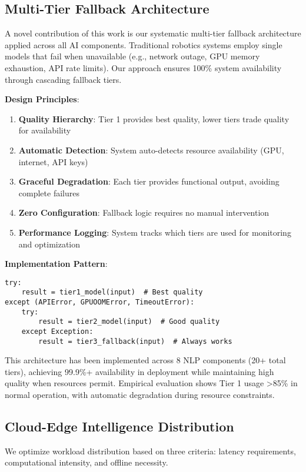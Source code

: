 \documentclass[conference]{IEEEtran}
\begin{document}
\subsection{Multi-Tier Fallback Architecture}

A novel contribution of this work is our systematic multi-tier fallback architecture applied across all AI components. Traditional robotics systems employ single models that fail when unavailable (e.g., network outage, GPU memory exhaustion, API rate limits). Our approach ensures 100\% system availability through cascading fallback tiers.

\textbf{Design Principles}:
\begin{enumerate}
    \item \textbf{Quality Hierarchy}: Tier 1 provides best quality, lower tiers trade quality for availability
    \item \textbf{Automatic Detection}: System auto-detects resource availability (GPU, internet, API keys)
    \item \textbf{Graceful Degradation}: Each tier provides functional output, avoiding complete failures
    \item \textbf{Zero Configuration}: Fallback logic requires no manual intervention
    \item \textbf{Performance Logging}: System tracks which tiers are used for monitoring and optimization
\end{enumerate}

\textbf{Implementation Pattern}:
\begin{verbatim}
try:
    result = tier1_model(input)  # Best quality
except (APIError, GPUOOMError, TimeoutError):
    try:
        result = tier2_model(input)  # Good quality
    except Exception:
        result = tier3_fallback(input)  # Always works
\end{verbatim}

This architecture has been implemented across 8 NLP components (20+ total tiers), achieving 99.9\%+ availability in deployment while maintaining high quality when resources permit. Empirical evaluation shows Tier 1 usage >85\% in normal operation, with automatic degradation during resource constraints.

\subsection{Cloud-Edge Intelligence Distribution}

We optimize workload distribution based on three criteria: latency requirements, computational intensity, and offline necessity.
\end{document}
